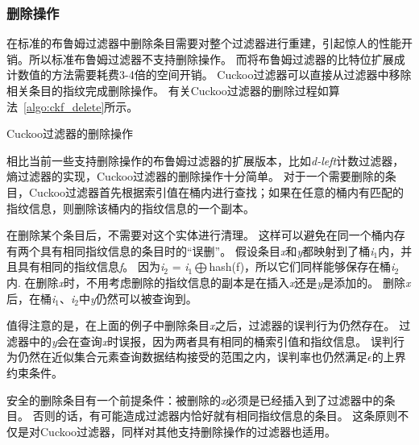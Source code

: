 \subsubsection{删除操作}
在标准的布鲁姆过滤器中删除条目需要对整个过滤器进行重建，引起惊人的性能开销。所以标准布鲁姆过滤器不支持删除操作。
而将布鲁姆过滤器的比特位扩展成计数值的方法需要耗费3-4倍的空间开销。
Cuckoo过滤器可以直接从过滤器中移除相关条目的指纹完成删除操作。
有关Cuckoo过滤器的删除过程如算法~\ref{algo:ckf_delete}所示。
\begin{algorithm}[htbp]
\SetAlgoLined
{}
\caption{Cuckoo过滤器的删除操作}
\label{algo:ckf_delete}
\end{algorithm}

相比当前一些支持删除操作的布鲁姆过滤器的扩展版本，比如\textit{d-left}计数过滤器，熵过滤器的实现，Cuckoo过滤器的删除操作十分简单。
对于一个需要删除的条目，Cuckoo过滤器首先根据索引值在桶内进行查找；如果在任意的桶内有匹配的指纹信息，则删除该桶内的指纹信息的一个副本。

在删除某个条目后，不需要对这个实体进行清理。
这样可以避免在同一个桶内存有两个具有相同指纹信息的条目时的“误删”。
假设条目\textit{x}和\textit{y}都映射到了桶\textit{i}$_1$内，并且具有相同的指纹信息\textit{f}。
因为\textit{i}$_2$ = \textit{i}$_1$\begin{math}\bigoplus\end{math}hash(f)，所以它们同样能够保存在桶\textit{i}$_2$内.
在删除\textit{x}时，不用考虑删除的指纹信息的副本是在插入\textit{x}还是\textit{y}是添加的。
删除\textit{x}后，在桶\textit{i}$_1$、\textit{i}$_2$中\textit{y}仍然可以被查询到。

值得注意的是，在上面的例子中删除条目\textit{x}之后，过滤器的误判行为仍然存在。
过滤器中的\textit{y}会在查询\textit{x}时误报，因为两者具有相同的桶索引值和指纹信息。
误判行为仍然在近似集合元素查询数据结构接受的范围之内，误判率也仍然满足\begin{math}\epsilon\end{math}的上界约束条件。

安全的删除条目有一个前提条件：被删除的\textit{x}必须是已经插入到了过滤器中的条目。
否则的话，有可能造成过滤器内恰好就有相同指纹信息的条目。
这条原则不仅是对Cuckoo过滤器，同样对其他支持删除操作的过滤器也适用。

